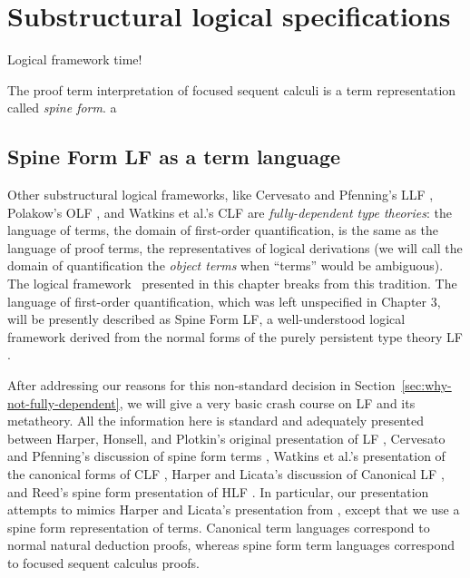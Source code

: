 \chapter{Substructural logical specifications}
\label{chapter-framework}

Logical framework time!

The proof term interpretation of focused sequent calculi is a term
representation called {\it spine form}. 
a

\section{Spine Form LF as a term language}

Other substructural logical frameworks, like Cervesato and Pfenning's
LLF \cite{cervesato02linear}, Polakow's OLF \cite{polakow01ordered},
and Watkins et al.'s CLF \cite{watkins02concurrent} are {\it
  fully-dependent type theories}: the language of terms, the domain of
first-order quantification, is the same as the language of proof
terms, the representatives of logical derivations (we will call the
domain of quantification the {\it object terms} when ``terms'' would
be ambiguous). The logical framework \sls~presented in this chapter
breaks from this tradition. The language of first-order
quantification, which was left unspecified in Chapter 3, will be
presently described as Spine Form LF, a well-understood logical
framework derived from the normal forms of the purely persistent type
theory LF \cite{harper93framework}.

After addressing our reasons for this non-standard decision in
Section~\ref{sec:why-not-fully-dependent}, we will give a very basic
crash course on LF and its metatheory. All the information here is
standard and adequately presented between Harper, Honsell, and
Plotkin's original presentation of LF \cite{harper93framework},
Cervesato and Pfenning's discussion of spine form terms
\cite{cervesato02linear}, Watkins et al.'s presentation of the
canonical forms of CLF \cite{watkins02concurrent}, Harper and Licata's
discussion of Canonical LF \cite{harper07mechanizing}, and Reed's
spine form presentation of HLF \cite{reed09hybrid}. In particular, our
presentation attempts to mimics Harper and Licata's presentation from
\cite{harper07mechanizing}, except that we use a spine form
representation of terms. Canonical term languages correspond to normal
natural deduction proofs, whereas spine form term languages correspond
to focused sequent calculus proofs.

